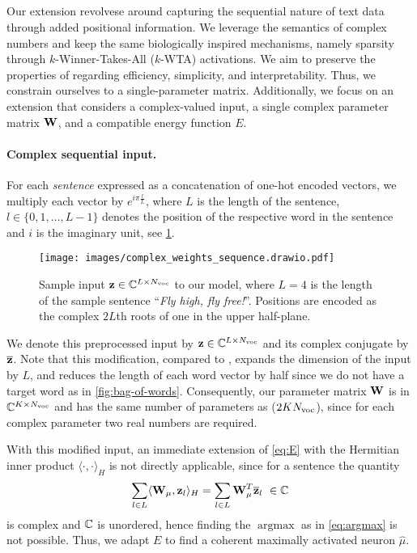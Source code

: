 \par
\subsection{\methodname}
Our extension revolvese around capturing the sequential nature of text data through added positional information.
We leverage the semantics of complex numbers and keep the same biologically inspired mechanisms, namely sparsity through $k$-Winner-Takes-All ($k$-WTA) activations.
We aim to preserve the properties of \flyvec regarding efficiency, simplicity, and interpretability.
Thus, we constrain ourselves to a single-parameter matrix.
Additionally, we focus on an extension that considers a complex-valued input, a single complex parameter matrix $\boldsymbol{\mathbf{W}}$, and a compatible energy function $E$.

\paragraph{Complex sequential input.}\label{ss:complexinput}
For each \textit{sentence} expressed as a concatenation of one-hot encoded vectors, we multiply each vector by $e^{i\pi\frac{l}{L}}$, where $L$ is the length of the sentence, $l \in \{0,1,\dotsc,L-1\}$ denotes the position of the respective word in the sentence and $i$ is the imaginary unit, see \cref{fig:complex-sequence}.
\begin{figure}[htb]
    \centering
    \texttt{[image: images/complex\_weights\_sequence.drawio.pdf]}
    \caption{Sample input $\boldsymbol{\mathbf{z}}\in\mathbb{C}^{L\times N_{\text{voc}}}$ to our \methodname model, where $L=4$ is the length of the sample sentence \enquote{\textit{Fly high, fly free!}}.
    Positions are encoded as the complex $2L$th roots of one in the upper half-plane.}
    \label{fig:complex-sequence}
\end{figure}
We denote this preprocessed input by $\boldsymbol{\mathbf{z}} \in \mathbb{C}^{L\times N_{\text{voc}}}$ and its complex conjugate by $\overline{\boldsymbol{\mathbf{z}}}$.
Note that this modification, compared to \flyvec, expands the dimension of the input by $L$, and reduces the length of each word vector by half since we do not have a target word as in \cref{fig:bag-of-words}.
Consequently, our parameter matrix $\boldsymbol{\mathbf{W}}$ is in $\mathbb{C}^{K \times N_{\text{voc}}}$ and has the same number of parameters as \flyvec ($2KN_{\text{voc}}$), since for each complex parameter two real numbers are required.

With this modified input, an immediate extension of \cref{eq:E} with the Hermitian inner product $\langle\cdot,\cdot\rangle_H$ is not directly applicable, since for a sentence the quantity
\begin{equation}\label{eq:newquantity}
\sum_{l \in L}\langle \boldsymbol{\mathbf{W}}_{\mu},\boldsymbol{\mathbf{z}}_l \rangle_H = \sum_{l\in L}\boldsymbol{\mathbf{W}}_{\mu}^T \overline{\boldsymbol{\mathbf{z}}}_l \ \in \mathbb{C}
\end{equation}
is complex and $\mathbb{C}$ is unordered, hence finding the $\operatorname{argmax}$ as in \cref{eq:argmax} is not possible.
Thus, we adapt $E$ to find a coherent maximally activated neuron $\widehat\mu$.

